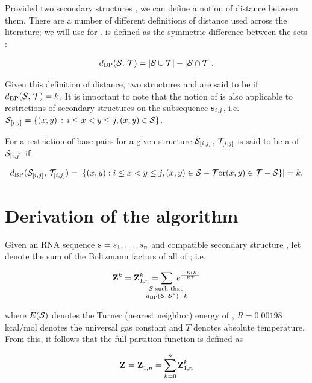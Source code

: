 Provided two secondary structures \strST, we can define a notion of
distance between them. There are a number of different definitions of distance
used across the literature; we will use {\em \bpd} for \fftbor.
\Bpd is defined as the symmetric difference between the sets
\strST:

\begin{align}
\label{eq:fftbor:dBP}
\dBP{\str}{\strT} = |\str \cup \strT| - |\str \cap \strT|.
\end{align}

Given this definition of distance, two structures \str and \strT are said to
be \kNbrs if $d_{\text{BP}}(\mathcal S,\,\mathcal T) = k$. It is important to note that
the notion of \bpd is also applicable to restrictions of secondary structures
on the subsequence ${\bf s}_{i,j}$,
i.e. $\mathcal S_{[i,j]} = \{ (x,y) \,:\, i \leq  x < y \leq j,  (x,y) \in \mathcal S \}$.

For a restriction of base pairs for a given structure $\mathcal S_{[i,j]}$,
$\mathcal T_{[i,j]}$ is said to be a \kNbr of $\mathcal S_{[i,j]}$ if

\begin{align}
\label{eq:fftbor:dBPonRestriction}
\dBP{\str_{[i,j]}}{\strT_{[i,j]}} =
|\{ (x,y): i \leq x<y\leq j,
(x,y) \in \str - \strT \text{or} (x,y) \in \strT - \str \}| = k.
\end{align}

\section{Derivation of the \fftbor algorithm}
\label{sec:fftbor:math}

Given an RNA sequence ${\bf s}=s_1,\dots,s_n$ and compatible secondary structure
\strSt, let  denote the sum of the Boltzmann factors
\boltzf{\str} of all \kNbrs \str of \strSt; i.e.

\begin{align}
\bfZ{k}{} = \bfZ{k}{1,n} =
\sum_{\mathclap{\substack{\str \text{ such that } \rule[-.5ex]{0pt}{0pt} \\
 \dBP{\str}{\strSt}=k}}}\;
\boltzF{\str}
\end{align}

where $E(\mathcal S)$ denotes the Turner (nearest neighbor)
energy \citep{}
of \str, $R = 0.00198$ kcal/mol denotes the universal
gas constant and $T$ denotes absolute temperature. From this, it follows that
the full partition function is defined as

\begin{align}
\label{eq:fftbor:partFunc}
\fullZ = \bfZ{}{1,n} = \sum_{k=0}^n \bfZ{k}{1,n}
\end{align}


